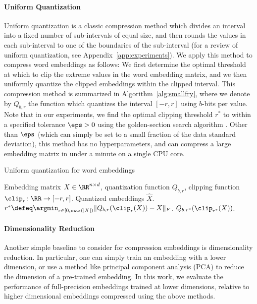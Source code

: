 \paragraph{Uniform Quantization}
Uniform quantization is a classic compression method which divides an interval into a fixed number of sub-intervals of equal size, and then rounds the values in each sub-interval to one of the boundaries of the sub-interval \citep{quant77} (for a review of uniform quantization, see Appendix~\ref{app:experiments}).
We apply this method to compress word embeddings as follows:
We first determine the optimal threshold at which to clip the extreme values in the word embedding matrix, and we then uniformly quantize the clipped embeddings within the clipped interval.
This compression method is summarized in Algorithm~\ref{alg:smallfry}, where we denote by $Q_{b,r}$ the function which quantizes the interval $[-r,r]$ using $b$-bits per value.
Note that in our experiments, we find the optimal clipping threshold $r^*$ to within a specified tolerance $\eps > 0$ using the golden-section search algorithm \citep{golden53}.
Other than $\eps$ (which can simply be set to a small fraction of the data standard deviation), this method has no hyperparameters, and can compress a large embedding matrix in under a minute on a single CPU core.

\begin{algorithm}[tb]
	\caption{Uniform quantization for word embeddings}
	\label{alg:smallfry}
	\begin{algorithmic}[1]
		  Embedding matrix $X \in \RR^{n \times d}$, quantization function $Q_{b,r}$, clipping function $\clip_r\colon\RR\rightarrow[-r,r]$.
		 Quantized embeddings $\hat{X}$.
		\STATE $r^* \defeq \argmin_{r \in [0,\max(|X|)} \|Q_{b,r}(\clip_r(X))-X\|_F$.
		 $Q_{b,r^*}(\clip_{r^*}(X))$.
	\end{algorithmic}
\end{algorithm}

\paragraph{Dimensionality Reduction}
Another simple baseline to consider for compression embeddings is dimensionality reduction.
In particular, one can simply train an embedding with a lower dimension, or use a method like principal component analysis (PCA) to reduce the dimension of a pre-trained embedding.
In this work, we evaluate the performance of full-precision embeddings trained at lower dimensions, relative to higher dimensional embeddings compressed using the above methods.

